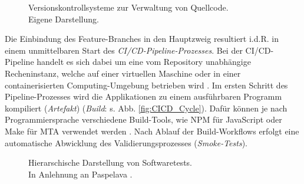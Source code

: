 \begin{center}
	\begin{figure}[H]
		\centering
		\caption[Versionskontrollsysteme zur Verwaltung von Quellcode]{Versionskontrollsysteme zur Verwaltung von Quellcode.\\ Eigene Darstellung.}
		\label{fig:VCS}
	\end{figure}
\end{center}
\vspace*{-10mm}
Die Einbindung des Feature-Branches in den Hauptzweig resultiert i.d.R. in einem unmittelbaren Start des \textit{CI/CD-Pipeline-Prozesses}. Bei der CI/CD-Pipeline handelt es sich dabei um eine vom Repository unabhängige Recheninstanz, welche auf einer virtuellen Maschine oder in einer containerisierten Computing-Umgebung betrieben wird \cite[Kap. 1.2]{Labouardy.2021}. Im ersten Schritt des Pipeline-Prozesses wird die Applikationen zu einem ausführbaren Programm kompiliert (\textit{Artefakt}) (\textit{Build}: s. Abb. \ref*{fig:CICD_Cycle}). Dafür können je nach Programmiersprache verschiedene Build-Tools, wie NPM für JavaScript oder Make für \ac{MTA} verwendet werden \cite[Kap. 7.1]{Labouardy.2021}. Nach Ablauf der Build-Workflows erfolgt eine automatische Abwicklung des Validierungsprozesses (\textit{Smoke-Tests}).
\begin{center}
	\begin{figure}[H]
		\centering
		\caption[Hierarschische Darstellung von Softwaretests]{Hierarschische Darstellung von Softwaretests.\\ \hspace{0.5cm}In Anlehnung an Paspelava \cite{Exposit.2021}.}
		\label{fig:Tests}
	\end{figure}
\end{center}
\vspace*{-10mm}
